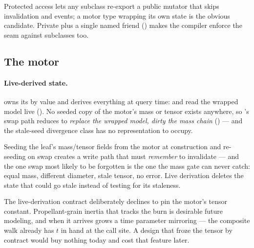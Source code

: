 \begin{rejected}
Protected access lets any subclass re-export a public mutator that skips invalidation
and events; a motor type wrapping its own state is the obvious candidate. Private plus a
single named friend () makes the compiler enforce the
seam against subclasses too.
\end{rejected}

\subsection{The motor}\label{sec:tradeoffs-motor}

\paragraph{Live-derived state.}
 owns its  by value and derives everything at query
time:  and  read the wrapped model live
(). No seeded copy of the motor's mass or tensor
exists anywhere, so 's swap path reduces to \emph{replace the
wrapped model, dirty the mass chain} () --- and the
stale-seed divergence class has no representation to occupy.

\begin{rejected}
Seeding the leaf's mass/tensor fields from the motor at construction and re-seeding on
swap creates a write path that must \emph{remember} to invalidate --- and the one swap
most likely to be forgotten is the one the mass gate can never catch: equal mass,
different diameter, stale tensor, no error. Live derivation deletes the state that could
go stale instead of testing for its staleness.
\end{rejected}

\begin{keyinsight}
The live-derivation contract deliberately declines to pin the motor's tensor constant.
Propellant-grain inertia that tracks the burn is desirable future modeling, and when it
arrives  grows a time parameter mirroring  --- the
composite walk already has $t$ in hand at the call site. A design that froze the tensor
by contract would buy nothing today and cost that feature later.
\end{keyinsight}

